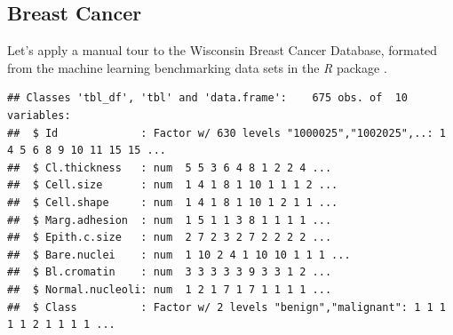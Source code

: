 \documentclass{monashthesis}
\begin{document}
\subsection{Breast Cancer}\label{breast-cancer}

Let's apply a manual tour to the Wisconsin Breast Cancer Database,
formated from the machine learning benchmarking data sets in the
\emph{R} package \autocite{leisch_mlbench:_2010}.

\begin{verbatim}
## Classes 'tbl_df', 'tbl' and 'data.frame':    675 obs. of  10 variables:
##  $ Id             : Factor w/ 630 levels "1000025","1002025",..: 1 4 5 6 8 9 10 11 15 15 ...
##  $ Cl.thickness   : num  5 5 3 6 4 8 1 2 2 4 ...
##  $ Cell.size      : num  1 4 1 8 1 10 1 1 1 2 ...
##  $ Cell.shape     : num  1 4 1 8 1 10 1 2 1 1 ...
##  $ Marg.adhesion  : num  1 5 1 1 3 8 1 1 1 1 ...
##  $ Epith.c.size   : num  2 7 2 3 2 7 2 2 2 2 ...
##  $ Bare.nuclei    : num  1 10 2 4 1 10 10 1 1 1 ...
##  $ Bl.cromatin    : num  3 3 3 3 3 9 3 3 1 2 ...
##  $ Normal.nucleoli: num  1 2 1 7 1 7 1 1 1 1 ...
##  $ Class          : Factor w/ 2 levels "benign","malignant": 1 1 1 1 1 2 1 1 1 1 ...
\end{verbatim}
\end{document}
